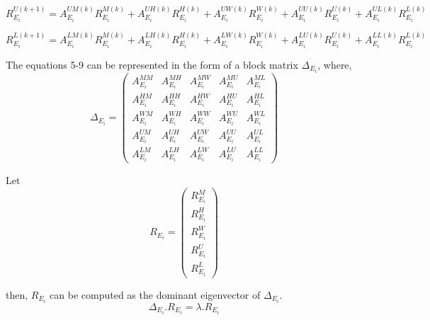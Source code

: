 \begin{equation}
R_{{E_{i}}}^{U(k+1)} = A_{E_{i}}^{UM(k)}R_{{E_{i}}}^{M(k)} + A_{E_{i}}^{UH(k)}R_{{E_{i}}}^{H(k)} + A_{E_{i}}^{UW(k)}R_{{E_{i}}}^{W(k)}+ A_{E_{i}}^{UU(k)}R_{{E_{i}}}^{U(k)} + A_{E_{i}}^{UL(k)}R_{{E_{i}}}^{L(k)}
\end{equation}



\begin{equation}
R_{{E_{i}}}^{L(k+1)} = A_{E_{i}}^{LM(k)}R_{{E_{i}}}^{M(k)} + A_{E_{i}}^{LH(k)}R_{{E_{i}}}^{H(k)} +A_{E_{i}}^{LW(k)}R_{{E_{i}}}^{W(k)}+ A_{E_{i}}^{LU(k)}R_{{E_{i}}}^{U(k)}+ A_{E_{i}}^{LL(k)}R_{{E_{i}}}^{L(k)}
\end{equation}


The equations 5-9 can be represented in the form of a block matrix $\Delta_{E_{i}}$, where,
\[ \Delta_{E_{i}} = \left( \begin{array}{ccccc}
A_{E_{i}}^{MM} & A_{E_{i}}^{MH} & A_{E_{i}}^{MW} &  A_{E_{i}}^{MU} & A_{E_{i}}^{ML} \\
A_{E_{i}}^{HM} & A_{E_{i}}^{HH} & A_{E_{i}}^{HW} & A_{E_{i}}^{HU} & A_{E_{i}}^{HL} \\
A_{E_{i}}^{WM} & A_{E_{i}}^{WH} & A_{E_{i}}^{WW} & A_{E_{i}}^{WU} & A_{E_{i}}^{WL}\\
A_{E_{i}}^{UM} & A_{E_{i}}^{UH} & A_{E_{i}}^{UW} & A_{E_{i}}^{UU} & A_{E_{i}}^{UL} \\
A_{E_{i}}^{LM} & A_{E_{i}}^{LH} & A_{E_{i}}^{LW} & A_{E_{i}}^{LU} & A_{E_{i}}^{LL} \end{array} \right)\] 

Let \[R_{E_{i}} = \left( \begin{array}{c}
R_{{E_{i}}}^{M} \\
R_{{E_{i}}}^{H} \\
R_{{E_{i}}}^{W} \\
R_{{E_{i}}}^{U} \\
R_{{E_{i}}}^{L} \end{array} \right)\] 

then, $R_{E_{i}}$ can be computed as the dominant eigenvector of $\Delta_{E_{i}}$.
\begin{equation}
\Delta_{E_{i}}.R_{E_{i}} = \lambda.R_{E_{i}}
\end{equation}

